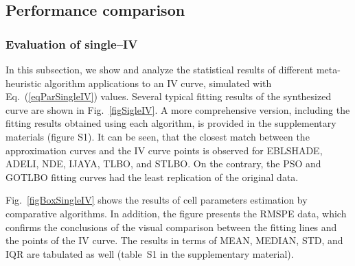\documentclass[a4paper,fleqn]{cas-dc}
\begin{document}

\subsection{Performance comparison}

\subsubsection{Evaluation of single--IV}

In this subsection, we show and analyze the statistical results of different meta-heuristic algorithm
applications to an IV curve, simulated with Eq.~(\ref{eqParSingleIV}) values.
Several typical fitting results of the synthesized curve are shown in Fig.~\ref{figSigleIV}.
A more comprehensive version, including the fitting results obtained using each algorithm,
is provided in the supplementary materials (figure S1).
It can be seen, that the closest match between the approximation curves and the IV curve points is
observed for EBLSHADE, ADELI, NDE, IJAYA, TLBO, and STLBO.
On the contrary, the PSO and GOTLBO fitting curves had the least replication of the original data.

Fig.~\ref{figBoxSingleIV} shows the results of cell parameters estimation by comparative algorithms.
In addition, the figure presents the RMSPE data,
which confirms the conclusions of the visual comparison between the fitting lines and the points of the IV curve.
The results in terms of MEAN, MEDIAN, STD, and IQR are tabulated as well (table~S1 in the supplementary material).
\end{document}
